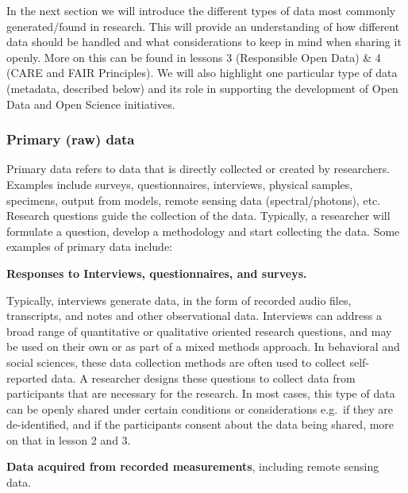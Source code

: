 \documentclass[
  letterpaper,
  DIV=11,
  numbers=noendperiod]{scrreport}
\begin{document}
In the next section we will introduce the different types of data most
commonly generated/found in research. This will provide an understanding
of how different data should be handled and what considerations to keep
in mind when sharing it openly. More on this can be found in lessons 3
(Responsible Open Data) \& 4 (CARE and FAIR Principles). We will also
highlight one particular type of data (metadata, described below) and
its role in supporting the development of Open Data and Open Science
initiatives.

\hypertarget{primary-raw-data}{%
\subsubsection*{Primary (raw) data}\label{primary-raw-data}}

Primary data refers to data that is directly collected or created by
researchers. Examples include surveys, questionnaires, interviews,
physical samples, specimens, output from models, remote sensing data
(spectral/photons), etc. Research questions guide the collection of the
data. Typically, a researcher will formulate a question, develop a
methodology and start collecting the data. Some examples of primary data
include:

\textbf{Responses to Interviews, questionnaires, and surveys.}

Typically, interviews generate data, in the form of recorded audio ﬁles,
transcripts, and notes and other observational data. Interviews can
address a broad range of quantitative or qualitative oriented research
questions, and may be used on their own or as part of a mixed methods
approach. In behavioral and social sciences, these data collection
methods are often used to collect self-reported data. A researcher
designs these questions to collect data from participants that are
necessary for the research. In most cases, this type of data can be
openly shared under certain conditions or considerations e.g.~if they
are de-identified, and if the participants consent about the data being
shared, more on that in lesson 2 and 3.

\textbf{Data acquired from recorded measurements}, including remote
sensing data.
\end{document}
